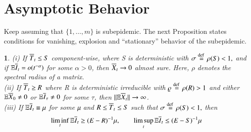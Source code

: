\documentclass[english]{elsarticle}
\theoremstyle{plain}
\theoremstyle{remark}
\theoremstyle{plain}
\newtheorem{prop}[thm]{\protect\propositionname}
\theoremstyle{definition}
\providecommand{\propositionname}{Proposition}
\begin{document}
\section{Asymptotic Behavior}

\label{sec:Asymptotic-behavior}Keep assuming that $\{1,\dots,m\}$
is subepidemic. The next Proposition states conditions for vanishing,
explosion and ``stationary'' behavior of the subepidemic.
\begin{prop}
\label{prop:as}(i) If $\overline{T}_{t}\leq S$ component-wise, where S
is deterministic with $\sigma\stackrel{\text{def }}{=}\rho(S)<1,$ and if $\mathbb{E}\overline{I}_{t}=o(t^{-\alpha})$
for some $\alpha>0$, then $\overline{X}_{t}\rightarrow0$ almost sure. Here,
$\rho$ denotes the spectral radius of a matrix.\\
(ii) If $\overline{T}_{t}\geq R$ where R is deterministic irreducible with
$\varrho\stackrel{\text{def }}{=}\rho(R)>1$ and either $\mathbb{E}\overline{X}_{0}\neq0$ or $\mathbb{E}\overline{I}_{\tau}\neq0$
for some $\tau$, then $\|\mathbb{E}\overline{X}_{t}\|\rightarrow\infty$.\\
(iii) If $\mathbb{E}\overline{I}_{t}\equiv\mu$ for some $\text{\ensuremath{\mu} }$and
$R\leq\overline{T}_{t}\leq S$ such that $\sigma\stackrel{\text{def }}{=}\rho(S)<1,$ then
\[
\liminf_{t}\mathbb{E}\overline{I}_{t}\ge(E-R)^{-1}\mu,\qquad\limsup_{t}\mathbb{E}\overline{I}_{t}\leq(E-S)^{-1}\mu
\]
\end{prop}
\end{document}
